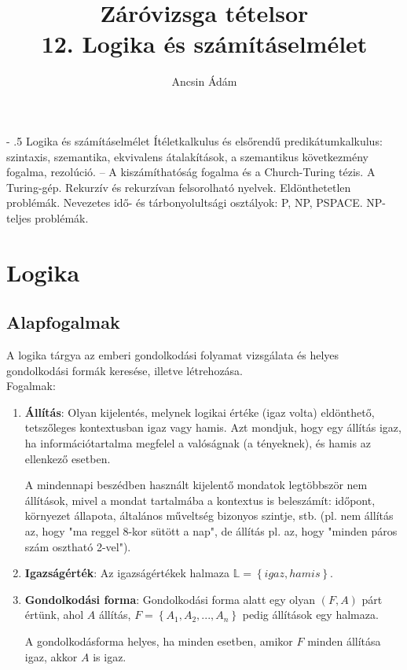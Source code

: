 \documentclass[margin=0px]{article}
\title{Záróvizsga tételsor \\ \large 12. Logika és számításelmélet}
\date{}
\author{Ancsin Ádám}
\makeatletter
\renewcommand\paragraph{%
	\@startsection{paragraph}{4}{0mm}%
	{-\baselineskip}%
	{.5\baselineskip}%
	{\normalfont\normalsize\bfseries}}
\newenvironment{tetel}[1]{\paragraph{#1}}{}
\makeatother
\begin{document}
	\maketitle
	
	\begin{tetel}{Logika és számításelmélet}
		Ítéletkalkulus és elsőrendű predikátumkalkulus: szintaxis, szemantika, ekvivalens átalakítások, a szemantikus következmény fogalma, rezolúció. – A kiszámíthatóság fogalma és a Church-Turing tézis. A Turing-gép. Rekurzív és rekurzívan felsorolható nyelvek. Eldönthetetlen problémák. Nevezetes idő- és tárbonyolultsági osztályok: P, NP, PSPACE. NP-teljes problémák.
	\end{tetel}
	
	\section{Logika}
	
	\subsection{Alapfogalmak}
	
	A logika tárgya az emberi gondolkodási folyamat vizsgálata és
	helyes gondolkodási formák keresése, illetve létrehozása.\\
	
	\noindent Fogalmak:
	\begin{enumerate}
		\item	\textbf{Állítás}: Olyan kijelentés, melynek logikai értéke (igaz
		volta) eldönthető, tetszőleges kontextusban igaz vagy hamis. Azt mondjuk,
		hogy egy állítás igaz, ha információtartalma megfelel a valóságnak (a tényeknek),
		és hamis az ellenkező esetben.
		
		A mindennapi beszédben használt kijelentő mondatok legtöbbször nem állítások, mivel
		a mondat tartalmába a kontextus is beleszámít: időpont, környezet állapota, általános műveltség
		bizonyos szintje, stb. (pl. nem állítás az, hogy "ma reggel 8-kor sütött a nap", de állítás pl. az, hogy
		"minden páros szám osztható 2-vel").
		
		\item	\textbf{Igazságérték}: Az igazságértékek halmaza $\mathbb{L}=\left\{igaz,hamis\right\}$.
		
		\item	\textbf{Gondolkodási forma}: Gondolkodási forma alatt egy olyan $(F,A)$ párt értünk, ahol
		$A$ állítás, $F=\left\{A_{1},A_{2},...,A_{n}\right\}$ pedig állítások egy halmaza.
		
		A gondolkodásforma helyes, ha minden esetben, amikor $F$ minden állítása
		igaz, akkor $A$ is igaz.
	\end{enumerate}
	
\end{document}
